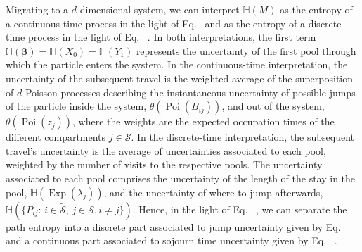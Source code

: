 \documentclass[smallextended]{svjour3}
\makeatletter
\renewcommand*{\eqref}[1]{%
  \hyperref[{#1}]{\textup{\tagform@{\ref*{#1}}}}%
}
\renewcommand{\vec}[1]{\mathbf{#1}}
\renewcommand{\H}{\mathbb{H}}
\newcommand{\Exp}{\operatorname{Exp}}
\newcommand{\Poi}{\operatorname{Poi}}
\providecommand{\DIFaddtex}[1]{{\protect\color{blue}\uwave{#1}}} %
\providecommand{\DIFdeltex}[1]{{\protect\color{red}\sout{#1}}}                      %
\providecommand{\DIFaddbegin}{} %
\providecommand{\DIFaddend}{} %
\providecommand{\DIFdelbegin}{} %
\providecommand{\DIFdelend}{} %
\providecommand{\DIFadd}[1]{\texorpdfstring{\DIFaddtex{#1}}{#1}} %
\providecommand{\DIFdel}[1]{\texorpdfstring{\DIFdeltex{#1}}{}} %
\newcommand{\DIFscaledelfig}{0.5}
\newlength{\DIFdelgraphicswidth} %
\newlength{\DIFdelgraphicsheight} %
\newcommand{\DIFaddincludegraphics}[2][]{{\color{blue}\fbox{\DIFOincludegraphics[#1]{#2}}}} %
\newcommand{\DIFdelincludegraphics}[2][]{%
\sbox{\DIFdelgraphicsbox}{\DIFOincludegraphics[#1]{#2}}%
\settoboxwidth{\DIFdelgraphicswidth}{\DIFdelgraphicsbox} %
\settoboxtotalheight{\DIFdelgraphicsheight}{\DIFdelgraphicsbox} %
\scalebox{\DIFscaledelfig}{%
\parbox[b]{\DIFdelgraphicswidth}{\usebox{\DIFdelgraphicsbox}\\[-\baselineskip] \rule{\DIFdelgraphicswidth}{0em}}\llap{\resizebox{\DIFdelgraphicswidth}{\DIFdelgraphicsheight}{%
\setlength{\unitlength}{\DIFdelgraphicswidth}%
\begin{picture}(1,1)%
\thicklines\linethickness{2pt} %
{\color[rgb]{1,0,0}\put(0,0){\framebox(1,1){}}}%
{\color[rgb]{1,0,0}\put(0,0){\line( 1,1){1}}}%
{\color[rgb]{1,0,0}\put(0,1){\line(1,-1){1}}}%
\end{picture}%
}\hspace*{3pt}}} %
} %
\DeclareRobustCommand{\DIFaddbegin}{\DIFOaddbegin \let\includegraphics\DIFaddincludegraphics} %
\DeclareRobustCommand{\DIFaddend}{\DIFOaddend \let\includegraphics\DIFOincludegraphics} %
\DeclareRobustCommand{\DIFdelbegin}{\DIFOdelbegin \let\includegraphics\DIFdelincludegraphics} %
\DeclareRobustCommand{\DIFdelend}{\DIFOaddend \let\includegraphics\DIFOincludegraphics} %
\makeatother
\begin{document}
Migrating to a $d$-dimensional system, we can interpret \DIFdelbegin \DIFdel{$\H(M)$ }\DIFdelend \DIFaddbegin \DIFadd{$\H(\mathcal{P})$ }\DIFaddend as the entropy of a continuous-time process in the light of Eq.~\eqref{eqn:H_occupation_time} and as the entropy of a discrete-time process in the light of Eq.~\eqref{eqn:H_number_of_visits}.
In both interpretations, the first term $\H(\vec{\beta})=\H(X_0)=\H(Y_1)$ represents the uncertainty of the first pool through which the particle enters the system.
In the continuous-time interpretation, the uncertainty of the subsequent travel is the weighted average of the superposition of $d$ Poisson processes describing the instantaneous uncertainty of possible jumps of the particle inside the system, $\theta(\Poi(B_{ij}))$, and out of the system, $\theta(\Poi(z_j))$, where the weights are the expected occupation times of the different compartments \DIFdelbegin \DIFdel{$j\in\mathcal{S}$}\DIFdelend \DIFaddbegin \DIFadd{$j\in S$}\DIFaddend . 
In the discrete-time interpretation, the subsequent travel's uncertainty is the average of uncertainties associated to each pool, weighted by the number of visits to the respective pools.
The uncertainty associated to each pool comprises the uncertainty of the length of the stay in the pool, $\H(\Exp(\lambda_j))$, and the uncertainty of where to jump afterwards, \DIFdelbegin \DIFdel{$\H(\{P_{ij}:\,i\in\widetilde{\mathcal{S}},\,j\in\mathcal{S},i\neq j\})$}\DIFdelend \DIFaddbegin \DIFadd{$\H(\{P_{ij}:\,i\in\widetilde{S},\,j\in S,i\neq j\})$}\DIFaddend .
Hence, in the light of Eq.~\eqref{eqn:H_number_of_visits}, we can separate the path entropy into a discrete part associated to jump uncertainty given by Eq.~\eqref{eqn:H_discrete} and a continuous part associated to sojourn time uncertainty given by Eq.~\eqref{eqn:H_continuous}.
\end{document}
